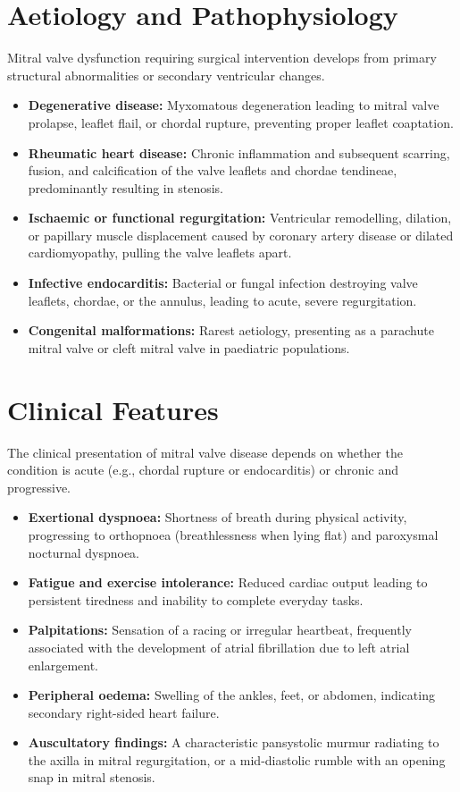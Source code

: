 \section*{Aetiology and Pathophysiology}
Mitral valve dysfunction requiring surgical intervention develops from primary structural abnormalities or secondary ventricular changes.
\begin{itemize}
    \item \textbf{Degenerative disease:} Myxomatous degeneration leading to mitral valve prolapse, leaflet flail, or chordal rupture, preventing proper leaflet coaptation.
    \item \textbf{Rheumatic heart disease:} Chronic inflammation and subsequent scarring, fusion, and calcification of the valve leaflets and chordae tendineae, predominantly resulting in stenosis.
    \item \textbf{Ischaemic or functional regurgitation:} Ventricular remodelling, dilation, or papillary muscle displacement caused by coronary artery disease or dilated cardiomyopathy, pulling the valve leaflets apart.
    \item \textbf{Infective endocarditis:} Bacterial or fungal infection destroying valve leaflets, chordae, or the annulus, leading to acute, severe regurgitation.
    \item \textbf{Congenital malformations:} Rarest aetiology, presenting as a parachute mitral valve or cleft mitral valve in paediatric populations.
\end{itemize}

\section*{Clinical Features}
The clinical presentation of mitral valve disease depends on whether the condition is acute (e.g., chordal rupture or endocarditis) or chronic and progressive.
\begin{itemize}
    \item \textbf{Exertional dyspnoea:} Shortness of breath during physical activity, progressing to orthopnoea (breathlessness when lying flat) and paroxysmal nocturnal dyspnoea.
    \item \textbf{Fatigue and exercise intolerance:} Reduced cardiac output leading to persistent tiredness and inability to complete everyday tasks.
    \item \textbf{Palpitations:} Sensation of a racing or irregular heartbeat, frequently associated with the development of atrial fibrillation due to left atrial enlargement.
    \item \textbf{Peripheral oedema:} Swelling of the ankles, feet, or abdomen, indicating secondary right-sided heart failure.
    \item \textbf{Auscultatory findings:} A characteristic pansystolic murmur radiating to the axilla in mitral regurgitation, or a mid-diastolic rumble with an opening snap in mitral stenosis.
\end{itemize}

